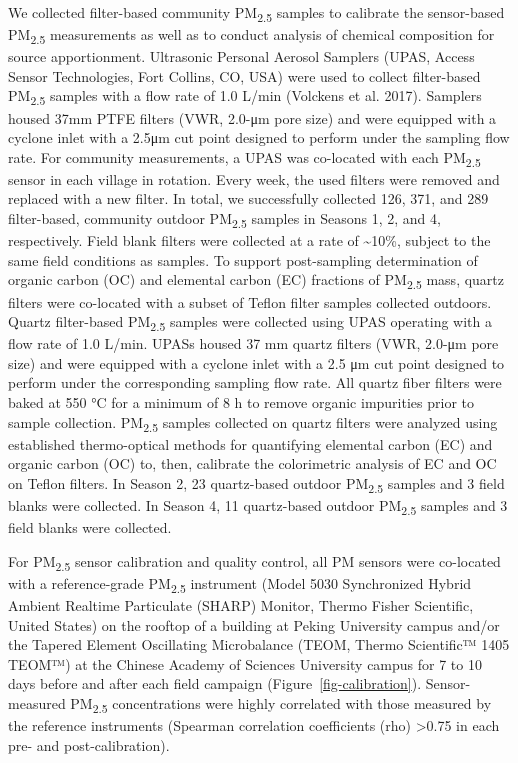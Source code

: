 \documentclass[
  letterpaper,
  DIV=11,
  numbers=noendperiod]{scrartcl}
\begin{document}
We collected filter-based community PM\textsubscript{2.5} samples to
calibrate the sensor-based PM\textsubscript{2.5} measurements as well as
to conduct analysis of chemical composition for source apportionment.
Ultrasonic Personal Aerosol Samplers (UPAS, Access Sensor Technologies,
Fort Collins, CO, USA) were used to collect filter-based
PM\textsubscript{2.5} samples with a flow rate of 1.0 L/min (Volckens et
al. 2017). Samplers housed 37mm PTFE filters (VWR, 2.0-μm pore size) and
were equipped with a cyclone inlet with a 2.5μm cut point designed to
perform under the sampling flow rate. For community measurements, a UPAS
was co-located with each PM\textsubscript{2.5} sensor in each village in
rotation. Every week, the used filters were removed and replaced with a
new filter. In total, we successfully collected 126, 371, and 289
filter-based, community outdoor PM\textsubscript{2.5} samples in Seasons
1, 2, and 4, respectively. Field blank filters were collected at a rate
of \textasciitilde10\%, subject to the same field conditions as samples.
To support post-sampling determination of organic carbon (OC) and
elemental carbon (EC) fractions of PM\textsubscript{2.5} mass, quartz
filters were co-located with a subset of Teflon filter samples collected
outdoors. Quartz filter-based PM\textsubscript{2.5} samples were
collected using UPAS operating with a flow rate of 1.0 L/min. UPASs
housed 37 mm quartz filters (VWR, 2.0-μm pore size) and were equipped
with a cyclone inlet with a 2.5 μm cut point designed to perform under
the corresponding sampling flow rate. All quartz fiber filters were
baked at 550 °C for a minimum of 8 h to remove organic impurities prior
to sample collection. PM\textsubscript{2.5} samples collected on quartz
filters were analyzed using established thermo-optical methods for
quantifying elemental carbon (EC) and organic carbon (OC) to, then,
calibrate the colorimetric analysis of EC and OC on Teflon filters. In
Season 2, 23 quartz-based outdoor PM\textsubscript{2.5} samples and 3
field blanks were collected. In Season 4, 11 quartz-based outdoor
PM\textsubscript{2.5} samples and 3 field blanks were collected.

For PM\textsubscript{2.5} sensor calibration and quality control, all PM
sensors were co-located with a reference-grade PM\textsubscript{2.5}
instrument (Model 5030 Synchronized Hybrid Ambient Realtime Particulate
(SHARP) Monitor, Thermo Fisher Scientific, United States) on the rooftop
of a building at Peking University campus and/or the Tapered Element
Oscillating Microbalance (TEOM, Thermo Scientific™ 1405 TEOM™) at the
Chinese Academy of Sciences University campus for 7 to 10 days before
and after each field campaign (Figure~\ref{fig-calibration}).
Sensor-measured PM\textsubscript{2.5} concentrations were highly
correlated with those measured by the reference instruments (Spearman
correlation coefficients (rho) \textgreater0.75 in each pre- and
post-calibration).
\end{document}
